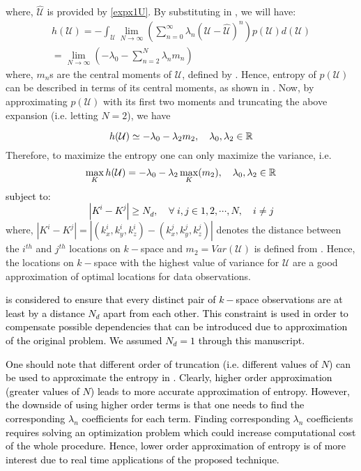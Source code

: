 \documentclass{article}         %
\theoremstyle{definition}
\theoremstyle{remark}
\begin{document}
where, $\hat{\mathcal{U}}$ is provided by \eqref{expx1U}. By substituting
 in , we will have: $  $
\begin{align}
h(\mathcal{U})=-\int_{\mathcal{U}} \lim_{N\rightarrow \infty} \left(\sum\limits_{n=0}^\infty \lambda_n (\mathcal{U}-\hat{\mathcal{U}})^n\right) p(\mathcal{U})d(\mathcal{U})\nonumber\\
= \lim_{N \rightarrow \infty} (-\lambda_0 - \sum\limits_{n=2}^{N} \lambda_n m_n) \label{entropy_moments}
\end{align}
where, $m_n$s are the central moments of $\mathcal{U}$, defined by . Hence, entropy of $p(\mathcal{U})$ can be described in terms of its central moments, as shown in . Now, by approximating $p(\mathcal{U})$ with its first two moments and truncating the above expansion (i.e. letting $N=2$), we have 

\begin{equation}\label{entropy_var}
h(\mathcal{U})\simeq -\lambda_0-\lambda_2 m_2,\quad \lambda_0,\lambda_2 \in \mathbb R
\end{equation}
Therefore, to maximize the entropy one can only maximize the variance, i.e.
\begin{eqnarray}\label{entropy_var_max}
\max_{K} h(\mathcal{U})= -\lambda_0 -\lambda_2 \max_{K}(m_2), \quad \lambda_0,\lambda_2 \in \mathbb R
\end{eqnarray}
\textcolor{black}{subject to:
\begin{equation}\label{sparsity_con}
|K^i-K^j|\geq N_d,\quad \forall\ i,j\in 1,2,\cdots,N,\quad i\neq j 
\end{equation}}
where, $|K^i-K^j|=|(k_x^i,k_y^i,k_z^i)-(k_x^j,k_y^j,k_z^j)|$ denotes the
distance between the $i^{th}$ and $j^{th}$ locations on $k-$space and
$m_2=Var(\mathcal{U})$ is defined from . Hence, the locations on
$k-$space with the highest value of variance for $\mathcal{U}$ are a good
approximation of optimal locations for data observations. 

\textcolor{black}{ is considered to ensure that every distinct
pair of $k-$space observations are at least by a distance $N_d$ apart from each
other. This constraint is used in order to compensate possible dependencies
that can be introduced due to approximation of the original problem. We assumed
$N_d=1$ through this manuscript.}

\textcolor{black}{One should note that different order of truncation (i.e.
different values of $N$) can be used to approximate the entropy in
. Clearly, higher order approximation (greater values of
$N$) leads to more accurate approximation of entropy. However, the downside of
using higher order terms is that one needs to find the corresponding
$\lambda_n$ coefficients for each term. Finding corresponding $\lambda_n$
coefficients requires solving an optimization problem which could increase
computational cost of the whole procedure. Hence, lower order approximation of
entropy is of more interest due to real time applications of the proposed
technique.}
\end{document}
